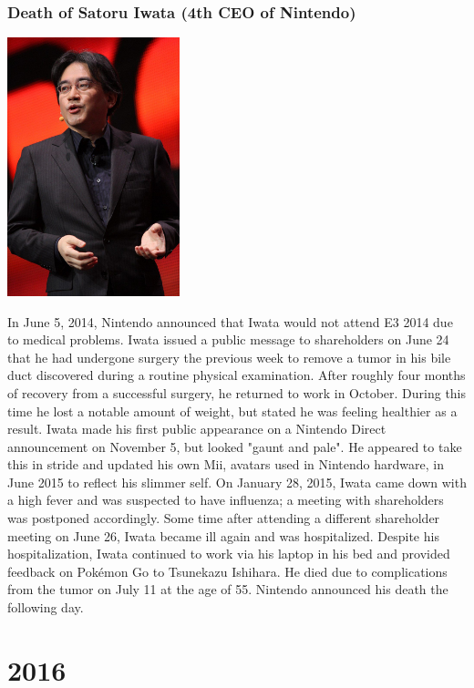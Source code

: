 \documentclass[11pt]{report}
\begin{document}
\subsection{Death of Satoru Iwata (4th CEO of Nintendo)}
\vspace{2mm}\begin{center}\includegraphics[width=5cm]{./img/satoruIwata.jpg}\end{center}
In June 5, 2014, Nintendo announced that Iwata would not attend E3 2014 due to medical problems. Iwata issued a public message to shareholders on June 24 that he had undergone surgery the previous week to remove a tumor in his bile duct discovered during a routine physical examination. After roughly four months of recovery from a successful surgery, he returned to work in October. During this time he lost a notable amount of weight, but stated he was feeling healthier as a result. Iwata made his first public appearance on a Nintendo Direct announcement on November 5, but looked "gaunt and pale". He appeared to take this in stride and updated his own Mii, avatars used in Nintendo hardware, in June 2015 to reflect his slimmer self. On January 28, 2015, Iwata came down with a high fever and was suspected to have influenza; a meeting with shareholders was postponed accordingly. Some time after attending a different shareholder meeting on June 26, Iwata became ill again and was hospitalized. Despite his hospitalization, Iwata continued to work via his laptop in his bed and provided feedback on Pokémon Go to Tsunekazu Ishihara. He died due to complications from the tumor on July 11 at the age of 55. Nintendo announced his death the following day.


\chapter{2016}
\end{document}
